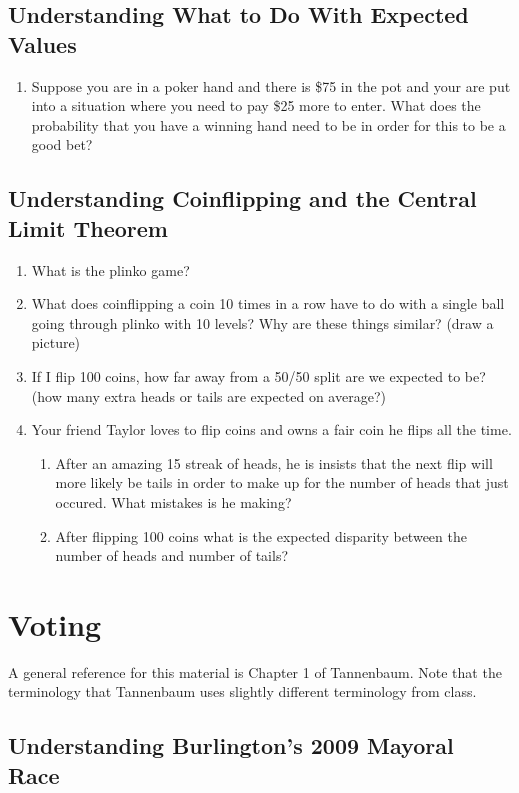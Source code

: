 \documentclass[11pt, letterpaper]{article}
\begin{document}
\subsection{Understanding What to Do With Expected Values}
\begin{enumerate}
	\item Suppose you are in a poker hand and there is \$75 in the pot and your are put into a situation where you need to pay \$25 more to enter. 
	What does the probability that you have a winning hand need to be in order for this to be a good bet?	
\end{enumerate}

\subsection{Understanding Coinflipping and the Central Limit Theorem}
\begin{enumerate}
	\item What is the plinko game? 
	\item What does coinflipping a coin 10 times in a row have to do with a single ball going through plinko with 10 levels? Why are these things similar? (draw a picture)
	\item If I flip 100 coins, how far away from a 50/50 split are we expected to be? (how many extra heads or tails are expected on average?)
	\item Your friend Taylor loves to flip coins and owns a fair coin he flips all the time. 
	\begin{enumerate}
		\item After an amazing 15 streak of heads, he is insists that the next flip will more likely be tails in order to make up for the number of heads that just occured. What mistakes is he making?
		\item After flipping 100 coins what is the expected disparity between the number of heads and number of tails?
	\end{enumerate}
\end{enumerate}

\newpage

\section{Voting} 
A general reference for this material is Chapter 1 of Tannenbaum.
Note that the terminology that Tannenbaum uses slightly different terminology from class. 

\subsection{Understanding Burlington's 2009 Mayoral Race }
\end{document}
